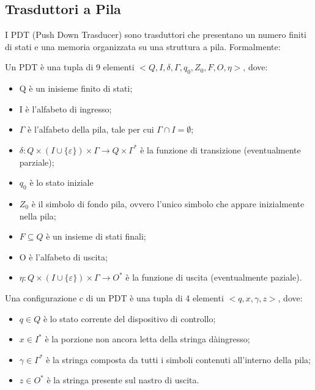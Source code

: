   \subsection{Trasduttori a Pila}
  I PDT (Push Down Trasducer) sono trasduttori che presentano un numero finiti di stati  e una memoria organizzata su una struttura a pila. Formalmente:

  \begin{definition}
    Un PDT è una tupla di 9 elementi \(<Q, I, \delta, \Gamma, q_0, Z_0, F, O, \eta>\), dove:
    \begin{itemize}
      \item Q è un inisieme finito di stati;
      \item I è l'alfabeto di ingresso;
      \item \(\Gamma\) è l'alfabeto della pila, tale per cui \(\Gamma \cap I = \emptyset\);
      \item \(\delta:Q\times (I\cup \{\varepsilon\})\times \Gamma \to Q \times \Gamma^*\) è la funzione di transizione (eventualmente parziale);
      \item \(q_0\) è lo stato iniziale
      \item \(Z_0\) è il simbolo di fondo pila, ovvero l'unico simbolo che appare inizialmente nella pila;
      \item \(F\subseteq Q\) è un insieme di stati finali;
      \item O è l'alfabeto di uscita;
      \item \(\eta: Q\times (I \cup \{\varepsilon\})\times \Gamma \to O^*\) è la funzione di uscita (eventualmente paziale).
    \end{itemize}    
  \end{definition}

  \begin{definition}
    Una configurazione c di un PDT è una tupla di 4 elementi \(<q,x,\gamma, z>\), dove:
    \begin{itemize}
      \item \(q \in Q\) è lo stato corrente del dispositivo di controllo;
      \item \(x \in I^*\) è la porzione non ancora letta della stringa dàingresso;
      \item \(\gamma \in \Gamma^*\) è la stringa composta da tutti i simboli contenuti all'interno della pila;
      \item \(z \in O^*\) è la stringa presente sul nastro di uscita.
    \end{itemize}
  \end{definition}

